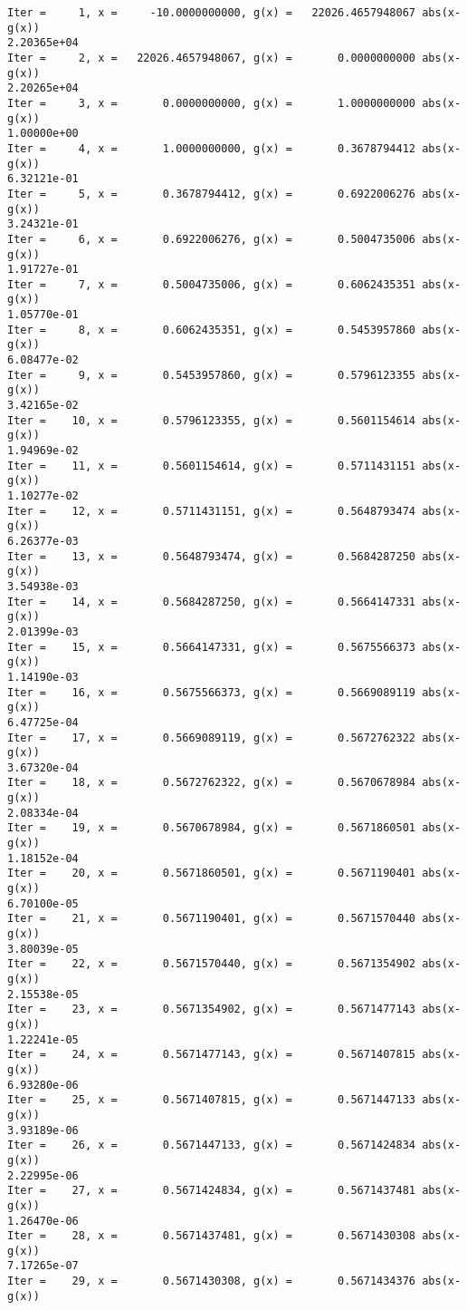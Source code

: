\documentclass[11pt]{article}
\begin{document}
    \begin{Verbatim}[commandchars=\\\{\}]
Iter =     1, x =     -10.0000000000, g(x) =   22026.4657948067 abs(x-g(x))
2.20365e+04
Iter =     2, x =   22026.4657948067, g(x) =       0.0000000000 abs(x-g(x))
2.20265e+04
Iter =     3, x =       0.0000000000, g(x) =       1.0000000000 abs(x-g(x))
1.00000e+00
Iter =     4, x =       1.0000000000, g(x) =       0.3678794412 abs(x-g(x))
6.32121e-01
Iter =     5, x =       0.3678794412, g(x) =       0.6922006276 abs(x-g(x))
3.24321e-01
Iter =     6, x =       0.6922006276, g(x) =       0.5004735006 abs(x-g(x))
1.91727e-01
Iter =     7, x =       0.5004735006, g(x) =       0.6062435351 abs(x-g(x))
1.05770e-01
Iter =     8, x =       0.6062435351, g(x) =       0.5453957860 abs(x-g(x))
6.08477e-02
Iter =     9, x =       0.5453957860, g(x) =       0.5796123355 abs(x-g(x))
3.42165e-02
Iter =    10, x =       0.5796123355, g(x) =       0.5601154614 abs(x-g(x))
1.94969e-02
Iter =    11, x =       0.5601154614, g(x) =       0.5711431151 abs(x-g(x))
1.10277e-02
Iter =    12, x =       0.5711431151, g(x) =       0.5648793474 abs(x-g(x))
6.26377e-03
Iter =    13, x =       0.5648793474, g(x) =       0.5684287250 abs(x-g(x))
3.54938e-03
Iter =    14, x =       0.5684287250, g(x) =       0.5664147331 abs(x-g(x))
2.01399e-03
Iter =    15, x =       0.5664147331, g(x) =       0.5675566373 abs(x-g(x))
1.14190e-03
Iter =    16, x =       0.5675566373, g(x) =       0.5669089119 abs(x-g(x))
6.47725e-04
Iter =    17, x =       0.5669089119, g(x) =       0.5672762322 abs(x-g(x))
3.67320e-04
Iter =    18, x =       0.5672762322, g(x) =       0.5670678984 abs(x-g(x))
2.08334e-04
Iter =    19, x =       0.5670678984, g(x) =       0.5671860501 abs(x-g(x))
1.18152e-04
Iter =    20, x =       0.5671860501, g(x) =       0.5671190401 abs(x-g(x))
6.70100e-05
Iter =    21, x =       0.5671190401, g(x) =       0.5671570440 abs(x-g(x))
3.80039e-05
Iter =    22, x =       0.5671570440, g(x) =       0.5671354902 abs(x-g(x))
2.15538e-05
Iter =    23, x =       0.5671354902, g(x) =       0.5671477143 abs(x-g(x))
1.22241e-05
Iter =    24, x =       0.5671477143, g(x) =       0.5671407815 abs(x-g(x))
6.93280e-06
Iter =    25, x =       0.5671407815, g(x) =       0.5671447133 abs(x-g(x))
3.93189e-06
Iter =    26, x =       0.5671447133, g(x) =       0.5671424834 abs(x-g(x))
2.22995e-06
Iter =    27, x =       0.5671424834, g(x) =       0.5671437481 abs(x-g(x))
1.26470e-06
Iter =    28, x =       0.5671437481, g(x) =       0.5671430308 abs(x-g(x))
7.17265e-07
Iter =    29, x =       0.5671430308, g(x) =       0.5671434376 abs(x-g(x))

\end{Verbatim}
\end{document}

